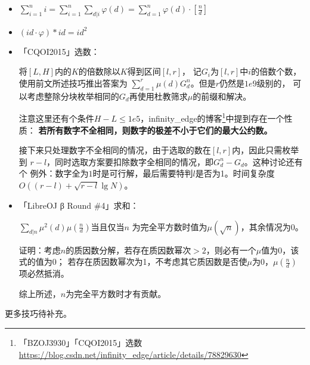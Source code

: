 \begin{itemize}
	\item $\displaystyle \sum_{i=1}^n{i}=
		      \sum_{i=1}^n{\sum_{d|i}\varphi(d)}=
		      \sum_{d=1}^n{\varphi(d)\cdot[\frac{n}{d}]}$
	\item $(id\cdot\varphi)*id=id^2$
	\item 「CQOI2015」选数：

	将$[L,H]$内的$K$的倍数除以$K$得到区间$[l,r]$，
	记$G_i$为$[l,r]$中$i$的倍数个数，使用前文所述技巧推出答案为
	$\displaystyle \sum_{d=1}^r{\mu(d)G_d^n}$。但是$r$仍然是$1e9$级别的，
	可以考虑整除分块枚举相同的$G_d$再使用杜教筛求$\mu$的前缀和解决。

	注意这里还有个条件$H-L\leq 1e5$，infinity\_edge的博客\footnote{
		「BZOJ3930」「CQOI2015」选数\\
		\url{https://blog.csdn.net/infinity\_edge/article/details/78829630}
	}中提到存在一个性质：
	{\bfseries 若所有数字不全相同，则数字的极差不小于它们的最大公约数。}

	接下来只处理数字不全相同的情况，由于选取的数在$[l,r]$内，因此只需枚举到
	$r-l$，同时选取方案要扣除数字全相同的情况，即$G_d^n-G_d$。这种讨论还有个
	例外：数字全为$1$时是可行解，最后需要特判$l$是否为1。时间复杂度
	$O((r-l)+\sqrt{r-l}\lg N)$。

	\item 「LibreOJ β Round \#4」求和：

	$\displaystyle \sum_{d|n}{\mu^2(d)\mu(\frac{n}{d})}$当且仅当$n$
	为完全平方数时值为$\mu(\sqrt{n})$，其余情况为0。

	证明：考虑$n$的质因数分解，若存在质因数幂次$>2$，则必有一个$\mu$值为0，该式的值为0；
	若存在质因数幂次为1，不考虑其它质因数是否使$\mu$为0，$\mu(\frac{n}{d})$项必然抵消。

	综上所述，$n$为完全平方数时才有贡献。
\end{itemize}
更多技巧待补充。
